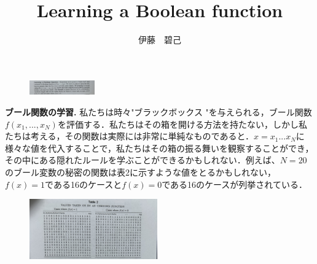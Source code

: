 \documentclass[dvipdfmx,a4paper,12pt]{jsarticle}
\title{Learning a Boolean function}
\author{伊藤　碧己}
\begin{document}
\maketitle


\begin{figure}[htbp]
  \centering
  \includegraphics[width=28mm,angle=270]{images/1.jpg}
\end{figure}
\textbf{ブール関数の学習.}
私たちは時々"ブラックボックス "を与えられる，ブール関数$f(x_{1},...,x_{N})$を評価する．私たちはその箱を開ける方法を持たない，しかし私たちは考える，その関数は実際には非常に単純なものであると．$x = x_{1}...x_{N}$に様々な値を代入することで，私たちはその箱の振る舞いを観察することができ，その中にある隠れたルールを学ぶことができるかもしれない．例えば、$N = 20$のブール変数の秘密の関数は表2に示すような値をとるかもしれない，$f(x) = 1$である16のケースと$f(x) = 0$である16のケースが列挙されている．
\begin{figure}[htbp]
  \centering
  \includegraphics[width=55mm,angle=270]{images/table2.jpg}
\end{figure}
\end{document}
